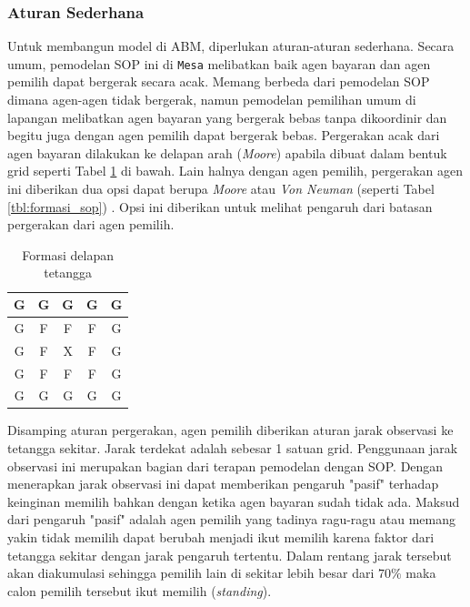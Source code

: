 \subsubsection{Aturan Sederhana}\label{sec:sbab_aturansederhana}

Untuk membangun model di ABM, diperlukan aturan-aturan sederhana. Secara umum, pemodelan SOP ini di \texttt{Mesa} melibatkan baik agen bayaran dan agen pemilih dapat bergerak secara acak. Memang berbeda dari pemodelan SOP \cite{miller2004standing} dimana agen-agen tidak bergerak, namun pemodelan pemilihan umum di lapangan melibatkan agen bayaran yang bergerak bebas tanpa dikoordinir dan begitu juga dengan agen pemilih dapat bergerak bebas. Pergerakan acak dari agen bayaran dilakukan ke delapan arah (\textit{Moore}) apabila dibuat dalam bentuk grid seperti Tabel \ref{tbl:formasi_moore} di bawah. Lain halnya dengan agen pemilih, pergerakan agen ini diberikan dua opsi dapat berupa \textit{Moore} atau \textit{Von Neuman} (seperti Tabel \ref{tbl:formasi_sop}) \cite{zaitsev2017generalized}. Opsi ini diberikan untuk melihat pengaruh dari batasan pergerakan dari agen pemilih.

\begin{table}[H]
		\centering
		\begin{tabular}{|c|c|c|c|c|}
		\hline
		\cellcolor{gray!10}G & \cellcolor{gray!10}G & \cellcolor{gray!10}G & \cellcolor{gray!10}G & \cellcolor{gray!10}G \\
		\hline
		\cellcolor{gray!10}G & \cellcolor{gray!30}F & \cellcolor{gray!30}F & \cellcolor{gray!30}F & \cellcolor{gray!10}G \\
		\hline
		\cellcolor{gray!10}G & \cellcolor{gray!30}F & \cellcolor{gray!50}X & \cellcolor{gray!30}F & \cellcolor{gray!10}G \\
		\hline
		\cellcolor{gray!10}G & \cellcolor{gray!30}F & \cellcolor{gray!30}F & \cellcolor{gray!30}F & \cellcolor{gray!10}G \\
		\hline
		\cellcolor{gray!10}G & \cellcolor{gray!10}G & \cellcolor{gray!10}G & \cellcolor{gray!10}G & \cellcolor{gray!10}G \\
		\hline
		\end{tabular}
		\caption{Formasi delapan tetangga}
		\label{tbl:formasi_moore}
	\end{table}

Disamping aturan pergerakan, agen pemilih diberikan aturan jarak observasi ke tetangga sekitar. Jarak terdekat adalah sebesar 1 satuan grid. Penggunaan jarak observasi ini merupakan bagian dari terapan pemodelan dengan SOP. Dengan menerapkan jarak observasi ini dapat memberikan pengaruh "pasif" terhadap keinginan memilih bahkan dengan ketika agen bayaran sudah tidak ada. Maksud dari pengaruh "pasif" adalah agen pemilih yang tadinya ragu-ragu atau memang yakin tidak memilih dapat berubah menjadi ikut memilih karena faktor dari tetangga sekitar dengan jarak pengaruh tertentu. Dalam rentang jarak tersebut akan diakumulasi sehingga pemilih lain di sekitar lebih besar dari $70\%$ maka calon pemilih tersebut ikut memilih (\textit{standing}).

